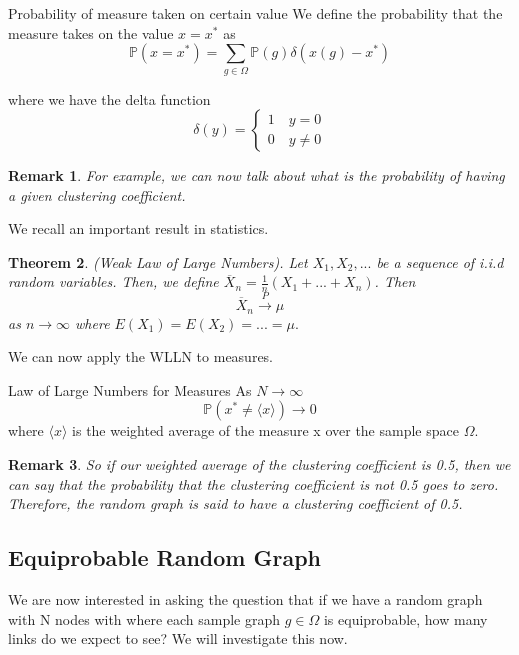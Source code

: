 \documentclass[twoside]{article}
\newcounter{lecnum}
\newcommand{\prob}{\mathbb{P}}
\newtheorem{theorem}{Theorem}[lecnum]
\newtheorem{remark}[theorem]{Remark}
\begin{document}
\begin{definition_exam}{Probability of measure taken on certain value}{}
We define the probability that the measure takes on the value $x = x^*$ as 
$$
\prob(x = x^*) = \sum_{g \in \Omega}\prob(g)\delta(x(g) - x^*)
$$

where we have the delta function
$$
\delta(y) = 
\begin{cases}
1 \quad y = 0\\
0 \quad y \neq 0
\end{cases}
$$
\end{definition_exam}
\begin{remark} For example, we can now talk about what is the probability of having a given clustering coefficient.
\end{remark}

We recall an important result in statistics.
\begin{theorem}(Weak Law of Large Numbers). Let $X_1,X_2,...$ be a sequence of i.i.d random variables. Then, we define $\overline{X}_n = \frac{1}{n}(X_1 + ... + X_n)$. Then 
$$
\overline{X}_n \xrightarrow{P} \mu
$$
as $n \rightarrow \infty$ where $E(X_1) = E(X_2) = ... = \mu.$
\end{theorem}

We can now apply the WLLN to measures.

\begin{proposition_exam}{Law of Large Numbers for Measures}{} As $N \rightarrow \infty$
$$
\prob(x^* \neq \langle x \rangle) \rightarrow 0
$$
where $\langle x \rangle$ is the weighted average of the measure x over the sample space $\Omega$.
\end{proposition_exam}

\begin{remark} So if our weighted average of the clustering coefficient is 0.5, then we can say that the probability that the clustering coefficient is not 0.5 goes to zero. Therefore, the random graph is said to have a clustering coefficient of 0.5.
\end{remark}

\subsection{Equiprobable Random Graph}

We are now interested in asking the question that if we have a random graph with N nodes with where each sample graph $g \in \Omega$ is equiprobable, how many links do we expect to see? We will investigate this now.
\end{document}
